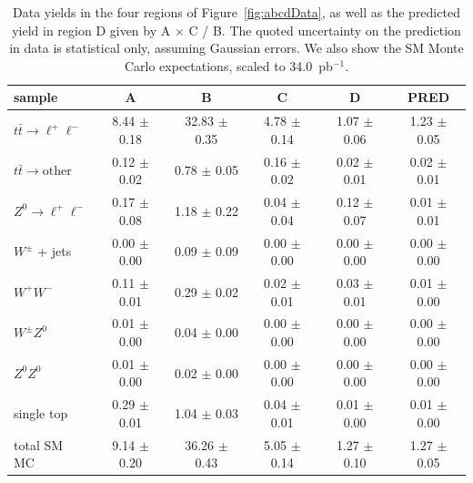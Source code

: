 \begin{table}[hbt]
\begin{center}
\caption{\label{tab:datayield} Data yields in the four
regions of Figure~\ref{fig:abcdData}, as well as the predicted yield in region D given
by A $\times$ C / B.  The quoted uncertainty
on the prediction in data is statistical only, assuming Gaussian errors.
We also show the SM Monte Carlo expectations, scaled to 34.0~pb$^{-1}$.}
\begin{tabular}{l||c|c|c|c||c}
\hline
              sample                     &                   A   &                   B   &                   C   &                   D   &                PRED  \\
\hline
$t\bar{t}\rightarrow \ell^{+}\ell^{-}$   &   8.44  $\pm$  0.18   &  32.83  $\pm$  0.35   &   4.78  $\pm$  0.14   &   1.07  $\pm$  0.06   &   1.23  $\pm$  0.05  \\
$t\bar{t}\rightarrow \mathrm{other}$     &   0.12  $\pm$  0.02   &   0.78  $\pm$  0.05   &   0.16  $\pm$  0.02   &   0.02  $\pm$  0.01   &   0.02  $\pm$  0.01  \\
$Z^0 \rightarrow \ell^{+}\ell^{-}$       &   0.17  $\pm$  0.08   &   1.18  $\pm$  0.22   &   0.04  $\pm$  0.04   &   0.12  $\pm$  0.07   &   0.01  $\pm$  0.01  \\
    $W^{\pm}$ + jets                     &   0.00  $\pm$  0.00   &   0.09  $\pm$  0.09   &   0.00  $\pm$  0.00   &   0.00  $\pm$  0.00   &   0.00  $\pm$  0.00  \\
            $W^+W^-$                     &   0.11  $\pm$  0.01   &   0.29  $\pm$  0.02   &   0.02  $\pm$  0.01   &   0.03  $\pm$  0.01   &   0.01  $\pm$  0.00  \\
        $W^{\pm}Z^0$                     &   0.01  $\pm$  0.00   &   0.04  $\pm$  0.00   &   0.00  $\pm$  0.00   &   0.00  $\pm$  0.00   &   0.00  $\pm$  0.00  \\
            $Z^0Z^0$                     &   0.01  $\pm$  0.00   &   0.02  $\pm$  0.00   &   0.00  $\pm$  0.00   &   0.00  $\pm$  0.00   &   0.00  $\pm$  0.00  \\
          single top                     &   0.29  $\pm$  0.01   &   1.04  $\pm$  0.03   &   0.04  $\pm$  0.01   &   0.01  $\pm$  0.00   &   0.01  $\pm$  0.00  \\
\hline
         total SM MC                     &   9.14  $\pm$  0.20   &  36.26  $\pm$  0.43   &   5.05  $\pm$  0.14   &   1.27  $\pm$  0.10   &   1.27  $\pm$  0.05  \\

\end{tabular}
\end{center}
\end{table}
